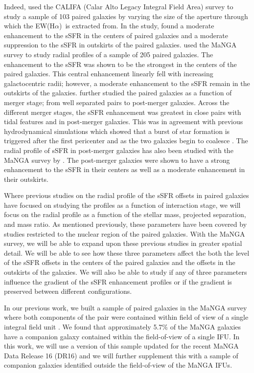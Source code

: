 \documentclass[iop,revtex4,twocolumn,apj,numberedappendix,appendixfloats]{emulateapj}
\newcommand{\ewha}{EW(H$\alpha$)}
\begin{document}
Indeed, \citet{Barrera-Ballesteros:2015} used the CALIFA (Calar Alto Legacy Integral Field Area) survey to study a sample of 103 paired galaxies by varying the size of the aperture through which the \ewha\ is extracted from. In the study, \citet{Barrera-Ballesteros:2015} found a moderate enhancement to the sSFR in the centers of paired galaxies and a moderate suppression to the sSFR in outskirts of the paired galaxies. 
%
\citet{Pan:2019} used the MaNGA survey to study radial profiles of a sample of 205 paired galaxies. The enhancement to the sSFR was shown to be the strongest in the centers of the paired galaxies. This central enhancement linearly fell with increasing galactocentric radii; however, a moderate enhancement to the sSFR remain in the outskirts of the galaxies. \citet{Pan:2019} further studied the paired galaxies as a function of merger stage; from well separated pairs to post-merger galaxies. Across the different merger stages, the sSFR enhancement was greatest in close pairs with tidal features and in post-merger galaxies. This was in agreement with previous hydrodynamical simulations which showed that a burst of star formation is triggered after the first pericenter and as the two galaxies begin to coalesce \citep{Scudder:2012}. 
%
The radial profile of sSFR in post-merger galaxies has also been studied with the MaNGA survey by \citet{Thorp:2019}. The post-merger galaxies were shown to have a strong enhancement to the sSFR in their centers as well as a moderate enhancement in their outskirts. 

Where previous studies on the radial profile of the sSFR offsets in paired galaxies have focused on studying the profiles as a function of interaction stage, we will focus on the radial profile as a function of the stellar mass, projected separation, and mass ratio. As mentioned previously, these parameters have been covered by studies restricted to the nuclear region of the paired galaxies. With the MaNGA survey, we will be able to expand upon these previous studies in greater spatial detail. We will be able to see how these three parameters affect the both the level of the sSFR offsets in the centers of the paired galaxies and the offsets in the outskirts of the galaxies. We will also be able to study if any of three parameters influence the gradient of the sSFR enhancement profiles or if the gradient is preserved between different configurations. 

In our previous work, we built a sample of paired galaxies in the MaNGA survey where both components of the pair were contained within field of view of a single integral field unit \citep[][hereafter ]{Fu:2018}. We found that approximately 5.7\% of the MaNGA galaxies have a companion galaxy contained within the field-of-view of a single IFU. In this work, we will use a version of this sample updated for the recent MaNGA Data Release 16 (DR16) \citep{Ahumada:2020} and we will further supplement this with a sample of companion galaxies identified outside the field-of-view of the MaNGA IFUs. 
\end{document}
